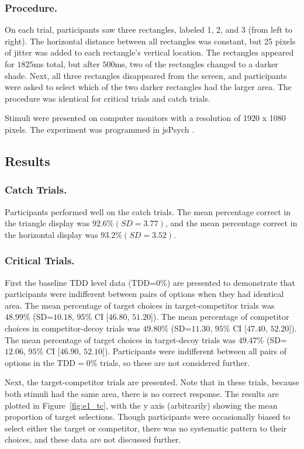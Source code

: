 \subsubsection{Procedure.}

On each trial, participants saw three rectangles, labeled 1, 2, and 3 (from left to right). The horizontal distance between all rectangles was constant, but 25 pixels of jitter was added to each rectangle's vertical location. The rectangles appeared for $1825$ms total, but after $500$ms, two of the rectangles changed to a darker shade. Next, all three rectangles disappeared from the screen, and participants were asked to select which of the two darker rectangles had the larger area. The procedure was identical for critical trials and catch trials.

Stimuli were presented on computer monitors with a resolution of 1920 x 1080 pixels. The experiment was programmed in jsPsych \parencite{deleeuwJsPsychJavaScriptLibrary2015}. 

\subsection{Results}

\subsubsection{Catch Trials.}
Participants performed well on the catch trials. The mean percentage correct in the triangle display was $92.6\% (SD=3.77)$, and the mean percentage correct in the horizontal display was $93.2\% (SD=3.52)$. 

\subsubsection{Critical Trials.}
First the baseline TDD level data (TDD=$0\%$) are presented to demonstrate that participants were indifferent between pairs of options when they had identical area. The mean percentage of target choices in target-competitor trials was $48.99\%$ (SD=$10.18$, $95\%$ CI [$46.80$, $51.20$]). The mean percentage of competitor choices in competitor-decoy trials was $49.80\%$ (SD=$11.30$, $95\%$ CI [$47.40$, $52.20$]). The mean percentage of target choices in target-decoy trials was $49.47\%$ (SD=$12.06$, $95\%$ CI [$46.90$, $52.10$]). Participants were indifferent between all pairs of options in the $\text{TDD}=0\%$ trials, so these are not considered further.

Next, the target-competitor trials are presented. Note that in these trials, because both stimuli had the same area, there is no correct response. The results are plotted in Figure~\ref{fig:e1_tc}, with the y axis (arbitrarily) showing the mean proportion of target selections. Though participants were occasionally biased to select either the target or competitor, there was no systematic pattern to their choices, and these data are not discussed further.

